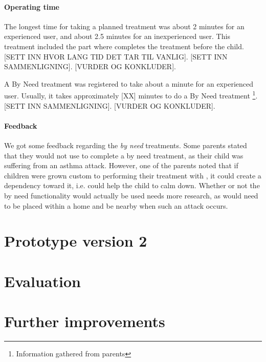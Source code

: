\paragraph{Operating time}
The longest time for taking a planned treatment was about 2 minutes for an experienced user, and about 2.5 minutes for an inexperienced user. This treatment included the part where \buddy{} completes the treatment before the child. [SETT INN HVOR LANG TID DET TAR TIL VANLIG]. [SETT INN SAMMENLIGNING]. [VURDER OG KONKLUDER].     

A By Need treatment was registered to take about a minute for an experienced user. Usually, it takes approximately [XX] minutes to do a By Need treatment \footnote{Information gathered from parents}. [SETT INN SAMMENLIGNING]. [VURDER OG KONKLUDER].  


\paragraph{Feedback}
We got some feedback regarding the \emph{by need} treatments. Some parents stated that they would not use \buddy{} to complete a by need treatment, as their child was suffering from an asthma attack. However, one of the parents noted that if children were grown custom to performing their treatment with \buddy{}, it could create a dependency toward it, i.e. \buddy{} could help the child to calm down. Whether or not the by need functionality would actually be used needs more research, as \buddy{} would need to be placed within a home and be nearby when such an attack occurs. 

  
%


\section{Prototype version 2}


\section{Evaluation}



\section{Further improvements}

